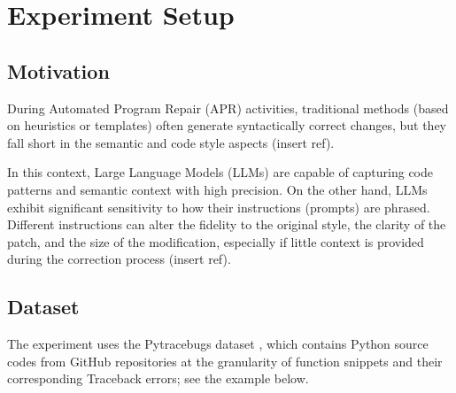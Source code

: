 \section{Experiment Setup}
\subsection{Motivation}

During Automated Program Repair (APR) activities, traditional methods (based on heuristics or templates) often generate syntactically correct changes, but they fall short in the semantic and code style aspects (insert ref).

In this context, Large Language Models (LLMs) are capable of capturing code patterns and semantic context with high precision.
On the other hand, LLMs exhibit significant sensitivity to how their instructions (prompts) are phrased. Different instructions can alter the fidelity to the original style, the clarity of the patch, and the size of the modification, especially if little context is provided during the correction process (insert ref).

\subsection{Dataset}

The experiment uses the Pytracebugs dataset \cite{Pytracebugs}, which contains Python source codes from GitHub repositories at the granularity of function snippets and their corresponding Traceback errors; see the example below.


